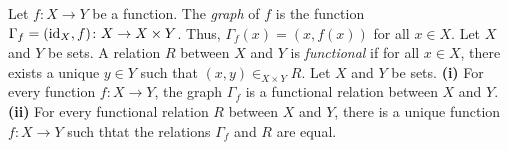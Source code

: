  Let $f \colon X \to Y$ be a function. The \textit{graph} of $f$ is the function $\Gamma_f = (\operatorname{id}_X, f) \colon X \to X \times Y$. Thus, $\Gamma_f(x) = (x, f(x))$ for all $x \in X$.
 Let $X$ and $Y$ be sets. A relation $R$ between $X$ and $Y$ is \textit{functional} if for all $x \in X$, there exists a unique $y \in Y$ such that $(x, y) \in_{X \times Y} R$.
 Let $X$ and $Y$ be sets. \textbf{(i)} For every function $f \colon X \to Y$, the graph $\Gamma_f$ is a functional relation between $X$ and $Y$. \textbf{(ii)} For every functional relation $R$ between $X$ and $Y$, there is a unique function $f \colon X \to Y$ such thtat the relations $\Gamma_f$ and $R$ are equal.
